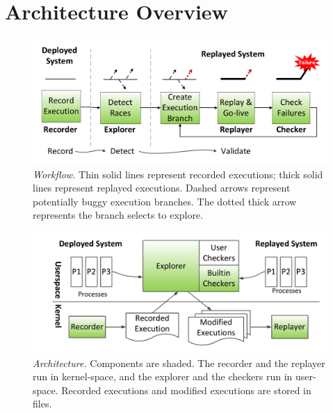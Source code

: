 \section{Architecture Overview} \label{racepro:sec:overview}


\begin{figure}[]
  \centering
  \includegraphics[width=0.8\linewidth]{figures/racepro/flow}
  \caption{{\em \racepro Workflow.} Thin solid lines represent recorded
    executions; thick solid lines represent replayed executions.  Dashed
    arrows represent potentially buggy execution branches. The dotted
    thick arrow represents the branch \racepro selects to
    explore.} \label{racepro:fig:flow}
\end{figure}

\begin{figure}[]
  \centering
  \includegraphics[width=0.8\linewidth]{figures/racepro/arch}
  \caption{{\em \racepro Architecture.} Components are shaded. The recorder
    and the replayer run in kernel-space, and the explorer and the
    checkers run in user-space.  Recorded executions and modified
    executions are stored in files.} \label{racepro:fig:arch}
\end{figure}


